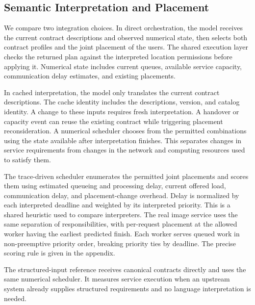 \subsection{Semantic Interpretation and Placement}
We compare two integration choices. In direct orchestration, the model receives the current contract descriptions and observed numerical state, then selects both contract profiles and the joint placement of the users. The shared execution layer checks the returned plan against the interpreted location permissions before applying it. Numerical state includes current queues, available service capacity, communication delay estimates, and existing placements.

In cached interpretation, the model only translates the current contract descriptions. The cache identity includes the descriptions, version, and catalog identity. A change to these inputs requires fresh interpretation. A handover or capacity event can reuse the existing contract while triggering placement reconsideration. A numerical scheduler chooses from the permitted combinations using the state available after interpretation finishes. This separates changes in service requirements from changes in the network and computing resources used to satisfy them.

The trace-driven scheduler enumerates the permitted joint placements and scores them using estimated queueing and processing delay, current offered load, communication delay, and placement-change overhead. Delay is normalized by each interpreted deadline and weighted by its interpreted priority. This is a shared heuristic used to compare interpreters. The real image service uses the same separation of responsibilities, with per-request placement at the allowed worker having the earliest predicted finish. Each worker serves queued work in non-preemptive priority order, breaking priority ties by deadline. The precise scoring rule is given in the appendix.

The structured-input reference receives canonical contracts directly and uses the same numerical scheduler. It measures service execution when an upstream system already supplies structured requirements and no language interpretation is needed.

